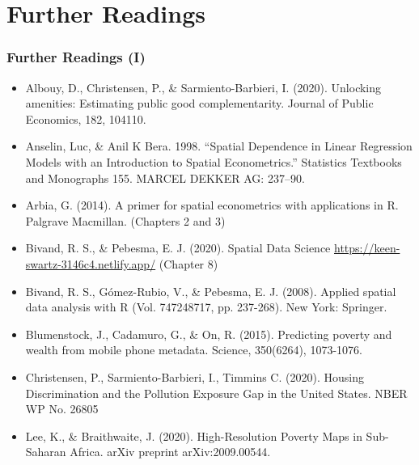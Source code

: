 \documentclass[
  shownotes,
  xcolor={svgnames},
  hyperref={colorlinks,citecolor=DarkBlue,linkcolor=DarkRed,urlcolor=DarkBlue}
   , aspectratio=169]{beamer}
\begin{document}
\section{Further Readings}
\begin{frame}
\frametitle{Further Readings (I)}
\scriptsize
\begin{itemize}

  \item Albouy, D., Christensen, P., \& Sarmiento-Barbieri, I. (2020). Unlocking amenities: Estimating public good complementarity. Journal of Public Economics, 182, 104110. 
  \medskip
  \item Anselin, Luc, \& Anil K Bera. 1998. “Spatial Dependence in Linear Regression Models with an Introduction to Spatial Econometrics.” Statistics Textbooks and Monographs 155. MARCEL DEKKER AG: 237–90.
  \medskip
  \item Arbia, G. (2014). A primer for spatial econometrics with applications in R. Palgrave Macmillan. (Chapters 2 and 3)
  \medskip
  \item Bivand, R. S.,  \& Pebesma, E. J. (2020). Spatial Data Science \url{https://keen-swartz-3146c4.netlify.app/} (Chapter 8)
  \medskip
  \item Bivand, R. S., Gómez-Rubio, V., \& Pebesma, E. J. (2008). Applied spatial data analysis with R (Vol. 747248717, pp. 237-268). New York: Springer.
  \medskip
  \item Blumenstock, J., Cadamuro, G., \& On, R. (2015). Predicting poverty and wealth from mobile phone metadata. Science, 350(6264), 1073-1076.
  \medskip
  \item Christensen, P.,  Sarmiento-Barbieri, I., Timmins C. (2020). Housing Discrimination and the Pollution Exposure Gap in the United States. NBER WP No. 26805
  \medskip
  \item Lee, K., \& Braithwaite, J. (2020). High-Resolution Poverty Maps in Sub-Saharan Africa. arXiv preprint arXiv:2009.00544.
  \end{itemize}
\end{frame}
\end{document}
